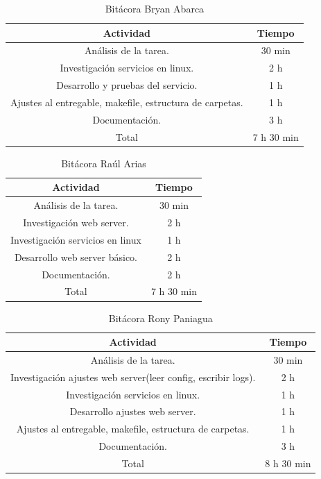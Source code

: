 \documentclass[conference]{IEEEtran}
\begin{document}
\begin{table}[ht]
\centering
\caption{Bitácora Bryan Abarca}
\begin{tabular}{|c|c|}
\hline
\textbf{Actividad} & \textbf{Tiempo} \\ \hline
Análisis de la tarea. & 30 min \\ \hline
Investigación servicios en linux. & 2 h\\ \hline
Desarrollo y pruebas del servicio. & 1 h\\ \hline
Ajustes al entregable, makefile, estructura de carpetas. & 1 h\\ \hline
Documentación. & 3 h\\ \hline
Total & 7 h 30 min\\ \hline

\end{tabular}
\end{table}

\begin{table}[ht]
\centering
\caption{Bitácora Raúl Arias}
\begin{tabular}{|c|c|}
\hline
\textbf{Actividad} & \textbf{Tiempo} \\ \hline
Análisis de la tarea. & 30 min \\ \hline 
Investigación web server. & 2 h  \\ \hline
Investigación servicios en linux & 1 h \\ \hline
Desarrollo web server básico. & 2 h \\ \hline
Documentación. & 2 h \\ \hline
Total & 7 h 30 min \\ \hline
\end{tabular}
\end{table}

\begin{table}[ht]
\centering
\caption{Bitácora Rony Paniagua}
\begin{tabular}{|c|c|}
\hline
\textbf{Actividad} & \textbf{Tiempo} \\ \hline
Análisis de la tarea. & 30 min \\ \hline
Investigación ajustes web server(leer config, escribir logs). & 2 h\\ \hline
Investigación servicios en linux. & 1 h\\ \hline
Desarrollo ajustes web server. & 1 h\\ \hline
Ajustes al entregable, makefile, estructura de carpetas. & 1 h\\ \hline
Documentación. & 3 h\\ \hline
Total & 8 h 30 min\\ \hline
\end{tabular}
\end{table}
\end{document}
